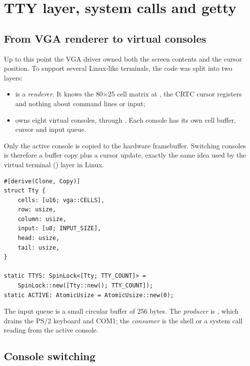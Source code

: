 \chapter{TTY layer, system calls and getty}
\label{cap:tty}

\section{From VGA renderer to virtual consoles}

Up to this point the VGA driver owned both the screen contents and the cursor
position. To support several Linux-like terminals, the code was split into two
layers:

\begin{itemize}
  \item {} is a \emph{renderer}. It knows the 80$\times$25 cell
        matrix at , the CRTC cursor registers and nothing about
        command lines or input;
  \item {} owns eight virtual consoles,  through
        . Each console has its own cell buffer, cursor and input
        queue.
\end{itemize}

Only the active console is copied to the hardware framebuffer. Switching
consoles is therefore a buffer copy plus a cursor update, exactly the same
idea used by the virtual terminal () layer in Linux.

\begin{lstlisting}[caption={Per-console state in \code{tty.rs}.},label={lst:ttytty}]
#[derive(Clone, Copy)]
struct Tty {
    cells: [u16; vga::CELLS],
    row: usize,
    column: usize,
    input: [u8; INPUT_SIZE],
    head: usize,
    tail: usize,
}

static TTYS: SpinLock<[Tty; TTY_COUNT]> =
    SpinLock::new([Tty::new(); TTY_COUNT]);
static ACTIVE: AtomicUsize = AtomicUsize::new(0);
\end{lstlisting}

The input queue is a small circular buffer of 256 bytes. The \emph{producer}
is , which drains the PS/2 keyboard and COM1; the
\emph{consumer} is the shell or a system call reading from the active console.

\section{Console switching}

